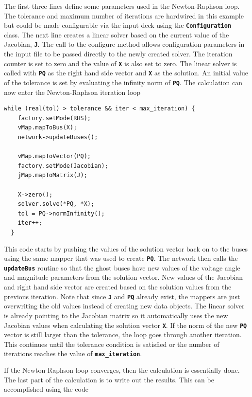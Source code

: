 The first three lines define some parameters used in the Newton-Raphson loop. The tolerance and maximum number of iterations are hardwired in this example but could be made configurable via the input deck using the \texttt{\textbf{Configuration}} class. The next line creates a linear solver based on the current value of the Jacobian, \texttt{\textbf{J}}. The call to the configure method allows configuration parameters in the input file to be passed directly to the newly created solver. The iteration counter is set to zero and the value of \texttt{\textbf{X}} is also set to zero. The linear solver is called with \texttt{\textbf{PQ}} as the right hand side vector and \texttt{\textbf{X}} as the solution. An initial value of the tolerance is set by evaluating the infinity norm of \texttt{\textbf{PQ}}. The calculation can now enter the Newton-Raphson iteration loop

{
\color{red}
\begin{Verbatim}[fontseries=b]
  while (real(tol) > tolerance && iter < max_iteration) {
    factory.setMode(RHS);
    vMap.mapToBus(X);
    network->updateBuses();

    vMap.mapToVector(PQ);
    factory.setMode(Jacobian);
    jMap.mapToMatrix(J);

    X->zero();
    solver.solve(*PQ, *X);
    tol = PQ->normInfinity();
    iter++;
  }
\end{Verbatim}
}

This code starts by pushing the values of the solution vector back on to the buses using the same mapper that was used to create \texttt{\textbf{PQ}}. The network then calls the \texttt{\textbf{updateBus}} routine so that the ghost buses have new values of the voltage angle and magnitude parameters from the solution vector. New values of the Jacobian and right hand side vector are created based on the solution values from the previous iteration. Note that since \texttt{\textbf{J}} and \texttt{\textbf{PQ}} already exist, the mappers are just overwriting the old values instead of creating new data objects. The linear solver is already pointing to the Jacobian matrix so it automatically uses the new Jacobian values when calculating the solution vector \texttt{\textbf{X}}. If the norm of the new \texttt{\textbf{PQ}} vector is still larger than the tolerance, the loop goes through another iteration. This continues until the tolerance condition is satisfied or the number of iterations reaches the value of \texttt{\textbf{max\_iteration}}.

If the Newton-Raphson loop converges, then the calculation is essentially done. The last part of the calculation is to write out the results. This can be accomplished using the code

